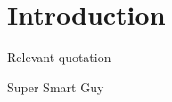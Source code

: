 
\chapter{Introduction}
\label{chap:intro}
\epigraph{Relevant quotation }{Super Smart Guy}
\lipsum[1-10]
